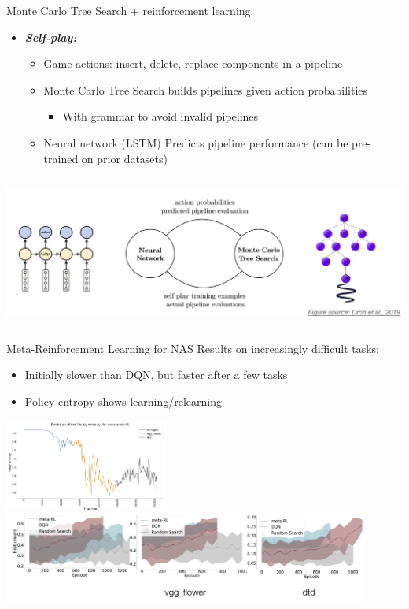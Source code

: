 \begin{frame}{Monte Carlo Tree Search + reinforcement learning}
    \begin{itemize}
        \item \textbf{\textit{Self-play:}}
        \begin{itemize}
            \item Game actions: insert, delete, replace components in a pipeline
            \item Monte Carlo Tree Search builds pipelines given action probabilities
            \begin{itemize}
                \item With grammar to avoid invalid pipelines
            \end{itemize}
            \item Neural network (LSTM) Predicts pipeline performance (can be pre-trained on prior datasets)
        \end{itemize}
    \end{itemize}
    \centering\includegraphics[height=5cm]{image/img235128.jpg}
\end{frame}
\begin{frame}{Meta-Reinforcement Learning for NAS}
    Results on increasingly difficult tasks:
    \begin{itemize}
        \item Initially slower than DQN, but faster after a few tasks
        \item Policy entropy shows learning/relearning
    \end{itemize}
    \includegraphics[height=3cm]{image/Picture4.png}
    \includegraphics[height=3cm]{image/Picture5.png}
\end{frame}

